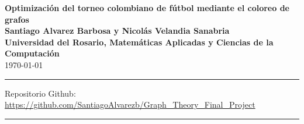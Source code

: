 \documentclass[11pt]{article}
\begin{document}
    \begin{center}
        \huge{\textbf{Optimización del torneo colombiano de fútbol mediante el coloreo de grafos}}\\[10pt]
        \small{\textbf{Santiago Alvarez Barbosa y Nicolás Velandia Sanabria}}\\[10pt]
        \small{\textbf{Universidad del Rosario, Matemáticas Aplicadas y Ciencias de la Computación}}\\[10pt]
        \today\\
        \rule{\textwidth}{0.5pt}
                Repositorio Github: \url{https://github.com/SantiagoAlvarezb/Graph_Theory_Final_Project}
        \rule{\textwidth}{0.5pt}
    \end{center}
\end{document}
